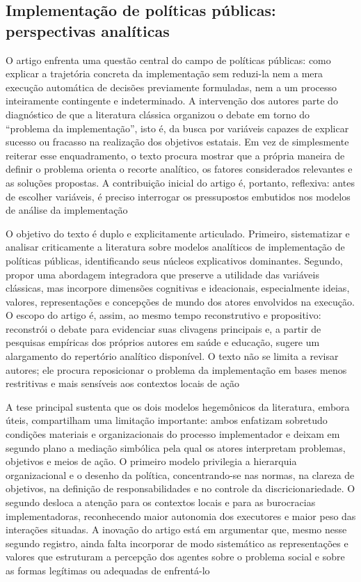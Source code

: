\documentclass[12pt,a4paper]{article}
\begin{document}
\subsection{Implementação de políticas públicas: perspectivas analíticas}
\label{sec:orge58c83d}

O artigo enfrenta uma questão central do campo de políticas públicas: como explicar a trajetória concreta da implementação sem reduzi-la nem a mera execução automática de decisões previamente formuladas, nem a um processo inteiramente contingente e indeterminado. A intervenção dos autores parte do diagnóstico de que a literatura clássica organizou o debate em torno do “problema da implementação”, isto é, da busca por variáveis capazes de explicar sucesso ou fracasso na realização dos objetivos estatais. Em vez de simplesmente reiterar esse enquadramento, o texto procura mostrar que a própria maneira de definir o problema orienta o recorte analítico, os fatores considerados relevantes e as soluções propostas. A contribuição inicial do artigo é, portanto, reflexiva: antes de escolher variáveis, é preciso interrogar os pressupostos embutidos nos modelos de análise da implementação\parencite{ascenzi2013_implementacao_politicas}

O objetivo do texto é duplo e explicitamente articulado. Primeiro, sistematizar e analisar criticamente a literatura sobre modelos analíticos de implementação de políticas públicas, identificando seus núcleos explicativos dominantes. Segundo, propor uma abordagem integradora que preserve a utilidade das variáveis clássicas, mas incorpore dimensões cognitivas e ideacionais, especialmente ideias, valores, representações e concepções de mundo dos atores envolvidos na execução. O escopo do artigo é, assim, ao mesmo tempo reconstrutivo e propositivo: reconstrói o debate para evidenciar suas clivagens principais e, a partir de pesquisas empíricas dos próprios autores em saúde e educação, sugere um alargamento do repertório analítico disponível. O texto não se limita a revisar autores; ele procura reposicionar o problema da implementação em bases menos restritivas e mais sensíveis aos contextos locais de ação\parencite{ascenzi2013_implementacao_politicas}

A tese principal sustenta que os dois modelos hegemônicos da literatura, embora úteis, compartilham uma limitação importante: ambos enfatizam sobretudo condições materiais e organizacionais do processo implementador e deixam em segundo plano a mediação simbólica pela qual os atores interpretam problemas, objetivos e meios de ação. O primeiro modelo privilegia a hierarquia organizacional e o desenho da política, concentrando-se nas normas, na clareza de objetivos, na definição de responsabilidades e no controle da discricionariedade. O segundo desloca a atenção para os contextos locais e para as burocracias implementadoras, reconhecendo maior autonomia dos executores e maior peso das interações situadas. A inovação do artigo está em argumentar que, mesmo nesse segundo registro, ainda falta incorporar de modo sistemático as representações e valores que estruturam a percepção dos agentes sobre o problema social e sobre as formas legítimas ou adequadas de enfrentá-lo\parencite{ascenzi2013_implementacao_politicas}
\end{document}
